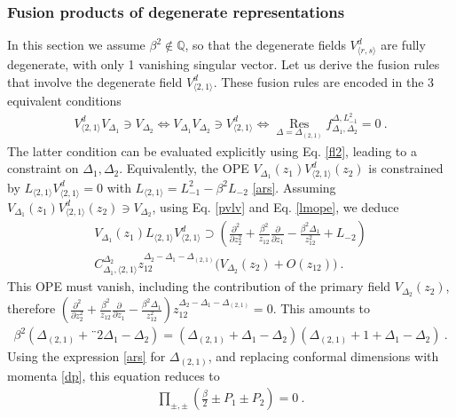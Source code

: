 \documentclass[12pt, a4paper]{article}
\begin{document}
\subsubsection{Fusion products of degenerate representations}\label{sec:fpdr}

In this section we assume $\beta^2\notin\mathbb{Q}$, so that the degenerate fields $V^d_{\langle r,s\rangle}$ are fully degenerate, with only 1 vanishing singular vector.
Let us derive the fusion rules that involve the degenerate field $V^d_{\langle 2,1\rangle}$. These fusion rules are encoded in the 3 equivalent conditions 
\begin{align}
V^d_{\langle 2,1\rangle} V_{\Delta_1}\ni V_{\Delta_2} \iff V_{\Delta_1}V_{\Delta_2} \ni V^d_{\langle 2,1\rangle} \iff \underset{\Delta=\Delta_{(2,1)}}{\operatorname{Res}} f^{\Delta,L_{-1}^2}_{\Delta_1,\Delta_2}=0\ . 
\end{align}
The latter condition can be evaluated explicitly using Eq. \eqref{fl2}, leading to a constraint on $\Delta_1,\Delta_2$. Equivalently, the OPE $V_{\Delta_1}(z_1)V^d_{\langle 2,1\rangle}(z_2)$ is constrained by $L_{\langle 2,1\rangle}V^d_{\langle 2,1\rangle}=0$ with $L_{\langle 2,1\rangle} = L_{-1}^2 -\beta^2L_{-2}$ \eqref{ars}. Assuming $V_{\Delta_1}(z_1)V^d_{\langle 2,1\rangle}(z_2)\ni V_{\Delta_2}$, 
using Eq. \eqref{pvlv} and Eq. \eqref{lmope}, we deduce 
\begin{multline}
 V_{\Delta_1}(z_1)L_{\langle 2,1\rangle}V^d_{\langle 2,1\rangle} \supset \left(\frac{\partial^2}{\partial z_2^2} + \frac{\beta^2}{z_{12}}\frac{\partial}{\partial z_1} -\frac{\beta^2\Delta_1}{z_{12}^2}+L_{-2}\right)
 \\
 C_{\Delta_1,\langle 2,1\rangle}^{\Delta_2} z_{12}^{\Delta_2-\Delta_1-\Delta_{(2,1)}}\Big(V_{\Delta_2}(z_2)+O(z_{12})\Big)\ .
\end{multline}
This OPE must vanish, including the contribution of the primary field $V_{\Delta_2}(z_2)$, therefore 
$\left(\frac{\partial^2}{\partial z_2^2} + \frac{\beta^2}{z_{12}}\frac{\partial}{\partial z_1} -\frac{\beta^2\Delta_1}{z_{12}^2}\right)
 z_{12}^{\Delta_2-\Delta_1-\Delta_{(2,1)}} =0$. This amounts to 
\begin{align}
 \beta^2 \left(\Delta_{(2,1)}+¨2\Delta_1-\Delta_2\right) = \left(\Delta_{(2,1)}+\Delta_1-\Delta_2\right)\left(\Delta_{(2,1)}+1+\Delta_1-\Delta_2\right)\ .
\end{align}
Using the expression \eqref{ars} for $\Delta_{(2,1)}$, and replacing conformal dimensions with momenta \eqref{dp}, this equation reduces to
\begin{align}
 \prod_{\pm,\pm}\left(\tfrac{\beta}{2}\pm P_1\pm P_2\right) = 0\ . 
\end{align}
\end{document}
